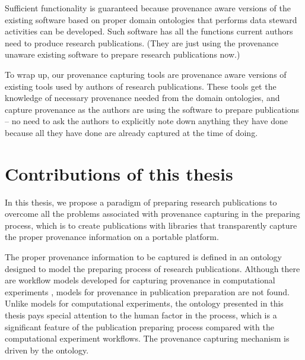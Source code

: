 Sufficient functionality is guaranteed because provenance aware versions of the existing software based on proper domain ontologies that performs data steward activities can be developed. Such software has all the functions current authors need to produce research publications. (They are just using the provenance unaware existing software to prepare research publications now.) 

To wrap up, our provenance capturing tools are provenance aware versions of existing tools used by authors of research publications. These tools get the knowledge of necessary provenance needed from the domain ontologies, and capture provenance as the authors are using the software to prepare publications -- no need to ask the authors to explicitly note down anything they have done because all they have done are already captured at the time of doing.

\section{Contributions of this thesis}

In this thesis, we propose a paradigm of preparing research publications to overcome all the problems associated with provenance capturing in the preparing process, which is to create publications with libraries that transparently capture the proper provenance information on a portable platform.

The proper provenance information to be captured is defined in an ontology designed to model the preparing process of research publications. Although there are workflow models developed for capturing provenance in computational experiments \cite{groth2006architecture, groth2009recording}, models for provenance in publication preparation are not found. Unlike models for computational experiments, the ontology presented in this thesis pays special attention to the human factor in the process, which is a significant feature of the publication preparing process compared with the computational experiment workflows. The provenance capturing mechanism is driven by the ontology.

